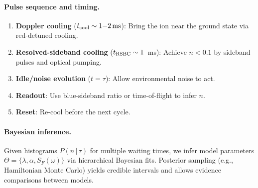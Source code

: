 \paragraph{Pulse sequence and timing.}
\begin{enumerate}
  \item \textbf{Doppler cooling} ($t_{\rm cool} \sim 1{-}2\,\text{ms}$): Bring the ion near the ground state via red-detuned cooling.
  \item \textbf{Resolved-sideband cooling} ($t_{\rm RSBC} \sim 1$~ms): Achieve $n < 0.1$ by sideband pulses and optical pumping.
  \item \textbf{Idle/noise evolution} ($t=\tau$): Allow environmental noise to act.
  \item \textbf{Readout}: Use blue-sideband ratio or time-of-flight to infer $n$.
  \item \textbf{Reset}: Re-cool before the next cycle.
\end{enumerate}

\paragraph{Bayesian inference.}
Given histograms $P(n\,|\,\tau)$ for multiple waiting times, we infer model parameters $\Theta = \{\lambda, \alpha, S_F(\omega)\}$ via hierarchical Bayesian fits.
Posterior sampling (e.g., Hamiltonian Monte Carlo) yields credible intervals and allows evidence comparisons between models.
